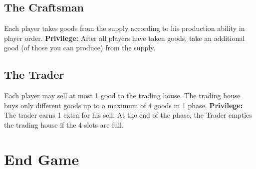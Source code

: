 \documentclass[12pt]{article}
\begin{document}
\begin{multicols*}{2}
\subsection*{The Craftsman}
Each player takes goods from the supply according to his production ability in player order. \textbf{Privilege:} After all players have taken goods, take an additional good (of those you can produce) from the supply.

\subsection*{The Trader}
Each player may sell at most 1 good to the trading house. The trading house buys only different goods up to a maximum of 4 goods in 1 phase. \textbf{Privilege:} The trader earns 1 extra for his sell. At the end of the phase, the Trader empties the trading house if the 4 slots are full.

\section*{End Game}

\end{multicols*}
\end{document}
